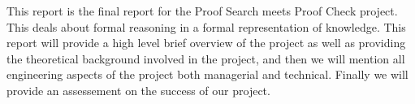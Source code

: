 This report is the final report for the Proof Search meets Proof Check
project. This deals about formal reasoning in a formal representation
of knowledge. This report will provide a high level brief overview of
the project as well as providing the theoretical background involved
in the project, and then we will mention all engineering aspects of
the project both managerial and technical. Finally we will provide an
assessement on the success of our project.
